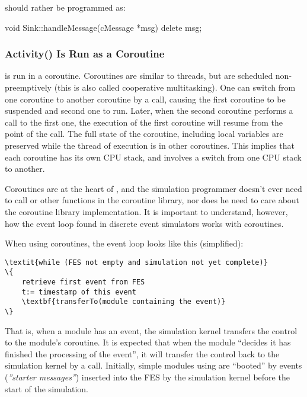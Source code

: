 should rather be programmed as:

\begin{cpp}
void Sink::handleMessage(cMessage *msg)
{
    delete msg;
}
\end{cpp}



\subsubsection{Activity() Is Run as a Coroutine}
\label{sec:simple-modules:activity:coroutine}

 is run in a coroutine.
Coroutines are similar to threads, but are scheduled
non-preemptively (this is also called cooperative
multitasking).
One can switch from one coroutine to another coroutine by a
 call, causing the first coroutine
to be suspended and second one to run. Later, when the
second coroutine performs a  call
to the first one, the execution of the first coroutine will resume
from the point of the  call.
The full state of the coroutine, including local variables are preserved while the
thread of execution is in other coroutines.  This implies that each
coroutine has its own CPU stack, and
 involves a switch from one CPU stack to
another.

Coroutines are at the heart of {\opp}, and the
simulation programmer doesn't ever need to call 
or other functions in the coroutine library, nor does he need to care
about the coroutine library implementation. It is important to
understand, however, how the event loop found in discrete event simulators
works with coroutines.

When using coroutines, the event loop looks like
this (simplified):


\begin{Verbatim}[commandchars=\\\{\}]
\textit{while (FES not empty and simulation not yet complete)}
\{
    retrieve first event from FES
    t:= timestamp of this event
    \textbf{transferTo(module containing the event)}
\}
\end{Verbatim}



That is, when a module has an event, the simulation
kernel transfers the control to the module's coroutine. It is expected
that when the module ``decides it has finished the processing of the
event'', it will transfer the control back to the simulation kernel by
a  call. Initially,
simple modules using  are
``booted'' by events (\textit{''starter messages''})
inserted into the FES by the simulation kernel before the
start of the simulation.


